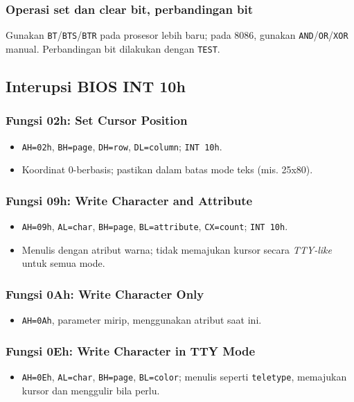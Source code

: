 \subsubsection{Operasi set dan clear bit, perbandingan bit}
Gunakan \texttt{BT}/\texttt{BTS}/\texttt{BTR} pada prosesor lebih baru; pada 8086, gunakan \texttt{AND}/\texttt{OR}/\texttt{XOR} manual. Perbandingan bit dilakukan dengan \texttt{TEST}.

\subsection{Interupsi BIOS INT 10h}
\subsubsection{Fungsi 02h: Set Cursor Position}
\begin{itemize}
  \item \texttt{AH=02h}, \texttt{BH=page}, \texttt{DH=row}, \texttt{DL=column}; \texttt{INT 10h}.
  \item Koordinat 0-berbasis; pastikan dalam batas mode teks (mis. 25x80).
\end{itemize}
\subsubsection{Fungsi 09h: Write Character and Attribute}
\begin{itemize}
  \item \texttt{AH=09h}, \texttt{AL=char}, \texttt{BH=page}, \texttt{BL=attribute}, \texttt{CX=count}; \texttt{INT 10h}.
  \item Menulis dengan atribut warna; tidak memajukan kursor secara \textit{TTY-like} untuk semua mode.
\end{itemize}
\subsubsection{Fungsi 0Ah: Write Character Only}
\begin{itemize}
  \item \texttt{AH=0Ah}, parameter mirip, menggunakan atribut saat ini.
\end{itemize}
\subsubsection{Fungsi 0Eh: Write Character in TTY Mode}
\begin{itemize}
  \item \texttt{AH=0Eh}, \texttt{AL=char}, \texttt{BH=page}, \texttt{BL=color}; menulis seperti \texttt{teletype}, memajukan kursor dan menggulir bila perlu.
\end{itemize}

